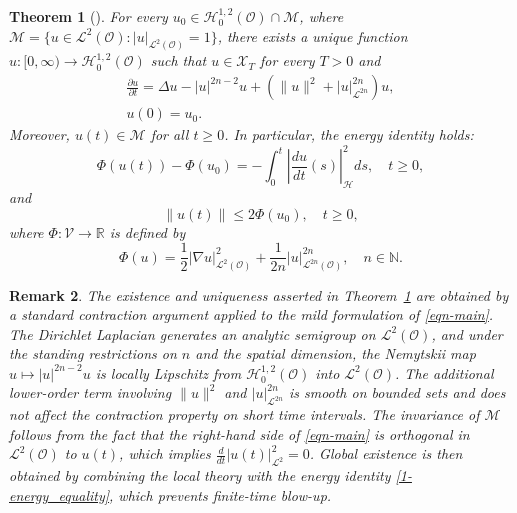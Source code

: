 \documentclass[10pt,a4paper]{amsart}
\numberwithin{equation}{section}
\newtheorem{theorem}{Theorem}[section]
\newtheorem{remark}[theorem]{Remark}
\begin{document}
\begin{theorem}[\cite{Hussain_2005}]
\label{1-Global}
For every $u_{0} \in \mathcal{H}_{0}^{1,2}(\mathcal{O}) \cap \mathcal{M}$, where
$\mathcal{M} = \{ u \in \mathcal{L}^{2}(\mathcal{O}) : |u|_{\mathcal{L}^{2}(\mathcal{O})}
 = 1 \}$,
there exists a unique function $u : [0, \infty) \to \mathcal{H}_{0}^{1,2}(\mathcal{O})$
such that $u \in \mathcal{X}_{T}$ for every $T > 0$ and
\begin{equation}\label{eqn-main}
\begin{gathered}
\frac{\partial u}{\partial t} = \Delta u - |u|^{2n-2} u + \left( \|u\|^{2} + |u|_{\mathcal{L}^{2n}}^{2n} \right) u, \\
u(0) = u_{0}.
\end{gathered}
\end{equation}
Moreover, $u(t) \in \mathcal{M}$ for all $t \ge 0$. In particular, the energy
identity holds:
\begin{equation}
\Phi(u(t)) - \Phi(u_{0}) = -\int_{0}^{t} | \frac{du}{dt}(s) |_{\mathcal{H}}^{2}  ds,
\quad t \ge 0,
\label{1-energy_equality}
\end{equation}
and
\[
\|u(t)\| \le 2 \Phi(u_{0}), \quad t \ge 0,
\]
where $\Phi : \mathcal{V} \to \mathbb{R}$ is defined by
\[
\Phi(u) = \frac{1}{2} |\nabla u|_{\mathcal{L}^2(\mathcal{O})}^{2}
+ \frac{1}{2n} |u|_{\mathcal{L}^{2n}(\mathcal{O})}^{2n}, \quad n \in \mathbb{N}.
\]
\end{theorem}

\begin{remark} \rm
The existence and uniqueness asserted in Theorem~\ref{1-Global} are obtained by
a standard contraction argument applied to the mild formulation of \eqref{eqn-main}.
The Dirichlet Laplacian generates an analytic semigroup on
$\mathcal{L}^{2}(\mathcal{O})$,
and under the standing restrictions on $n$ and the spatial dimension, the Nemytskii map
$u\mapsto |u|^{2n-2}u$ is locally Lipschitz from $\mathcal{H}_{0}^{1,2}(\mathcal{O})$
into $\mathcal{L}^{2}(\mathcal{O})$.
The additional lower-order term involving $\|u\|^{2}$ and $|u|_{\mathcal{L}^{2n}}^{2n}$
is smooth on bounded sets and does not affect the contraction property on short time intervals.
The invariance of $\mathcal{M}$ follows from the fact that the right-hand side of
\eqref{eqn-main} is orthogonal in $\mathcal{L}^{2}(\mathcal{O})$ to $u(t)$, which implies
$\frac{d}{dt}|u(t)|_{\mathcal{L}^{2}}^{2}=0$.
Global existence is then obtained by combining the local theory with the energy identity
\eqref{1-energy_equality}, which prevents finite-time blow-up.
\end{remark}
\end{document}
